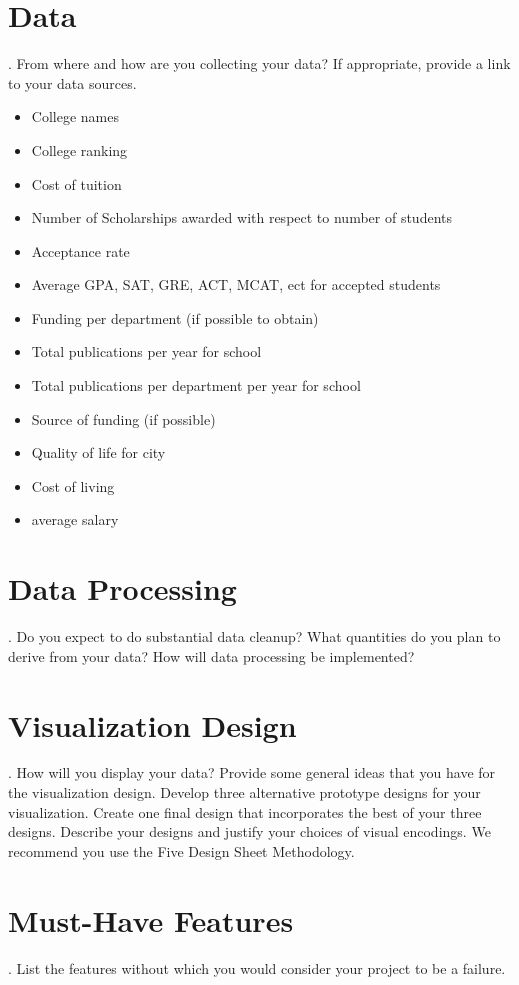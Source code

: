 \documentclass[11pt, a4paper]{article}
\begin{document}
\section{Data}{. From where and how are you collecting your data? If appropriate, provide a link to your data sources.}
\begin{itemize}
  \setlength\itemsep{0.5em}
\item College names
\item College ranking
\item Cost of tuition
\item Number of Scholarships awarded with respect to number of students
\item Acceptance rate
\item Average GPA, SAT, GRE, ACT, MCAT, ect for accepted students
\item Funding per department (if possible to obtain)
\item Total publications per year for school
\item Total publications per department per year for school
\item Source of funding (if possible)
\item Quality of life for city
\item Cost of living
\item average salary
 
  \end{itemize}

\section{Data Processing}{. Do you expect to do substantial data cleanup? What quantities do you plan to derive from your data? How will data processing be implemented?}

\section{Visualization Design}{. How will you display your data? Provide some general ideas that you have for the visualization design. Develop three alternative prototype designs for your visualization. Create one final design that incorporates the best of your three designs. Describe your designs and justify your choices of visual encodings. We recommend you use the Five Design Sheet Methodology.}

\section{Must-Have Features}{. List the features without which you would consider your project to be a failure.}
\end{document}
